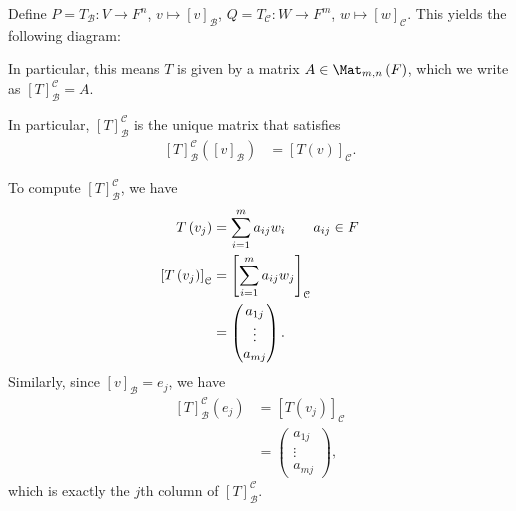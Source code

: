 \documentclass[10pt]{mypackage}
\begin{document}
Define $P = T_{\mathcal{B}}: V\rightarrow F^n$, $v\mapsto \left[v\right]_{\mathcal{B}}$, $Q =  T_{\mathcal{C}}: W\rightarrow F^{m}$, $w \mapsto \left[w\right]_{\mathcal{C}}$. This yields the following diagram:
\begin{center}
\end{center}
In particular, this means $T$ is given by a matrix $A\in \Mat_{m,n}\left(F\right)$, which we write as $\left[T\right]_{\mathcal{B}}^{\mathcal{C}} = A$.\newline

In particular, $\left[T\right]_{\mathcal{B}}^{\mathcal{C}}$ is the unique matrix that satisfies
\begin{align*}
  \left[T\right]_{\mathcal{B}}^{\mathcal{C}}\left(\left[v\right]_{\mathcal{B}}\right) &= \left[T(v)\right]_{\mathcal{C}}.
\end{align*}

To compute $\left[T\right]_{\mathcal{B}}^{\mathcal{C}}$, we have
  \begin{align*}
    T\left(v_j\right) &= \sum_{i=1}^{m}a_{ij}w_i \tag*{$a_{ij}\in F$}\\
    \left[T\left(v_j\right)\right]_{\mathcal{C}} &= \left[\sum_{i=1}^{m}a_{ij}w_j\right]_{\mathcal{C}}\\
                                                 &= \begin{pmatrix}a_{1j}\\\vdots\\a_{mj}\end{pmatrix}.
  \end{align*}
  Similarly, since $\left[v\right]_{\mathcal{B}} = e_j$, we have
  \begin{align*}
    \left[T\right]_{\mathcal{B}}^{\mathcal{C}}\left(e_j\right) &= \left[T\left(v_j\right)\right]_{\mathcal{C}}\\
                                                               &= \begin{pmatrix}a_{1j}\\\vdots\\a_{mj}\end{pmatrix},
  \end{align*}
  which is exactly the $j$th column of $\left[T\right]_{\mathcal{B}}^{\mathcal{C}}$.\newline
\end{document}
